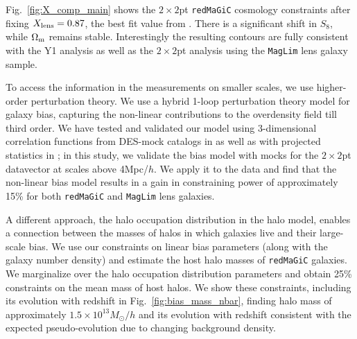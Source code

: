 \documentclass[aps, prd,twocolumn,superscriptaddress,nofootinbib,preprintnumbers]{revtex4-1}
\newcommand{\redmagic}{\texttt{redMaGiC} }
\newcommand{\maglim}{\texttt{MagLim} }
\begin{document}
Fig.~\ref{fig:X_comp_main} shows the $2\times2$pt \redmagic cosmology constraints after fixing $X_{\rm lens}=0.87$, the best fit value from \citet{y3-3x2ptkp}. There is a significant shift in $S_8$, while $\Omega_{\rm m}$ remains stable. Interestingly the resulting contours are fully consistent with the Y1 analysis as well as the $2\times2$pt analysis using the \maglim lens galaxy sample. 

To access the information in the measurements on smaller scales, we use higher-order perturbation theory. We use a hybrid 1-loop perturbation theory model for galaxy bias, capturing the non-linear contributions to the overdensity field till third order. We have tested and validated our model using 3-dimensional correlation functions from DES-mock catalogs in \citet{p2020perturbation} as well as with projected statistics in \citet*{y3-simvalidation}; in this study, we validate the bias model with mocks for the $2\times2$pt datavector at scales above 4Mpc/$h$. We apply it to the data and find that the non-linear bias model results in a gain in constraining power of approximately 15\% for both \redmagic and \maglim lens galaxies. 


A different approach, the halo occupation distribution in the halo model, enables a connection between the masses of halos in which galaxies live and their large-scale bias. We use our constraints on linear bias parameters (along with the galaxy number density) and estimate the host halo masses of \redmagic galaxies. We marginalize over the halo occupation distribution parameters and obtain 25\% constraints on the mean mass of host halos. We show these constraints, including its evolution with redshift in Fig.~\ref{fig:bias_mass_nbar}, finding halo mass of approximately $1.5 \times 10^{13} M_{\odot}/h$ and its evolution with redshift consistent with the expected pseudo-evolution due to changing background density. 
\end{document}
